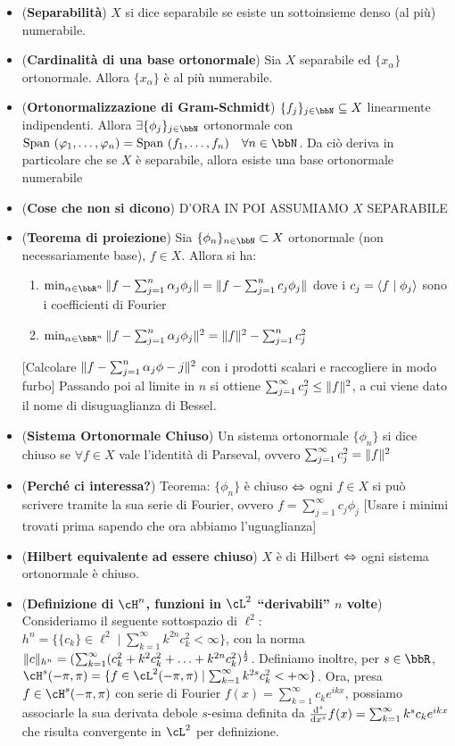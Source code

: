 \documentclass[a4paper,NoNotes,GeneralMath]{stdmdoc}
\newcommand{\cl}{\ell}
\begin{document}
\begin{itemize}
        \item ({\bf Separabilità}) $X$ si dice separabile se esiste un sottoinsieme denso (al più) numerabile.
        \item ({\bf Cardinalità di una base ortonormale}) Sia $X$ separabile ed $\{x_\alpha\}$ ortonormale. Allora $\{x_\alpha\}$ è al più numerabile.
        \item ({\bf Ortonormalizzazione di Gram-Schmidt}) $\{f_j\}_{j \in \bbN} \subseteq X$ linearmente indipendenti. Allora $\exists \{\phi_j\}_{j \in \bbN}$ ortonormale con $\Span(\varphi_1, \ldots, \varphi_n) = \Span(f_1, \ldots, f_n) \quad \forall n \in \bbN$. Da ciò deriva in particolare che se $X$ è separabile, allora esiste una base ortonormale numerabile
        \item ({\bf Cose che non si dicono}) D'ORA IN POI ASSUMIAMO $X$ SEPARABILE
        \item ({\bf Teorema di proiezione}) Sia $\{ \phi_n \}_{n \in \bbN} \subset X$ ortonormale (non necessariamente base), $f \in X$. Allora si ha:
          \begin{enumerate}
          \item $\min_{\alpha \in \bbR^n} \norm{f - \sum_{j=1}^n \alpha_j \phi_j} = \norm{f - \sum_{j=1}^n c_j \phi_j}$ dove i $c_j = \langle f \mid \phi_j \rangle$ sono i coefficienti di Fourier
          \item $\min_{\alpha \in \bbR^n} \norm{f - \sum_{j=1}^n \alpha_j \phi_j}^2 = \norm{f}^2 - \sum_{j=1}^n c_j^2$
          \end{enumerate}
          [Calcolare $\| {f - \sum_{j=1}^n \alpha_j \phi-j} \|^2$ con i prodotti scalari e raccogliere in modo furbo]
          Passando poi al limite in $n$ si ottiene $\sum_{j=1}^\infty c_j^2 \le \| {f} \|^2$, a cui viene dato il nome di disuguaglianza di Bessel.
        \item ({\bf Sistema Ortonormale Chiuso}) Un sistema ortonormale $\{ \phi_n \}$ si dice chiuso se $\forall f \in X$ vale l'identità di Parseval, ovvero $\sum_{j=1}^\infty c_j^2 = \| {f} \|^2$
        \item ({\bf Perché ci interessa?}) Teorema: $\{ \phi_n \}$ è chiuso $\Leftrightarrow$ ogni $f \in X$ si può scrivere tramite la sua serie di Fourier, ovvero $f = \sum_{j=1}^\infty c_j \phi_j$ [Usare i minimi trovati prima sapendo che ora abbiamo l'uguaglianza]
        \item ({\bf Hilbert equivalente ad essere chiuso}) $X$ è di Hilbert $\Leftrightarrow$ ogni sistema ortonormale è chiuso.
        \item ({\bf Definizione di $\cH^n$, funzioni in $\cL^2$ ``derivabili'' $n$ volte}) Consideriamo il seguente sottospazio di $\cl^2$: $h^n = \{ \{c_k\} \in \cl^2 \mid \sum_{k = 1}^\infty k^{2n}c_k^2 < \infty \}$, con la norma $\| {c} \|_{h^n} = (\sum_{k=1}^\infty (c_k^2 + k^2 c_k^2 + \ldots + k^{2n} c_k^2)^\frac{1}{2}$. Definiamo inoltre, per $s \in \bbR$, $\cH^s(-\pi, \pi) = \{ f \in \cL^2(-\pi, \pi) \mid \sum_{k=1}^\infty k^{2s} c^2_k < +\infty \}$. Ora, presa $f \in \cH^s(-\pi, \pi)$ con serie di Fourier $f(x) = \sum_{k=1}^\infty c_k e^{ikx}$, possiamo associarle la sua derivata debole $s$-esima definita da $\de{{}^s}{x^s} f(x) = \sum_{k=1}^\infty k^s c_k e^{ikx}$ che risulta convergente in $\cL^2$ per definizione.

\end{itemize}
\end{document}
